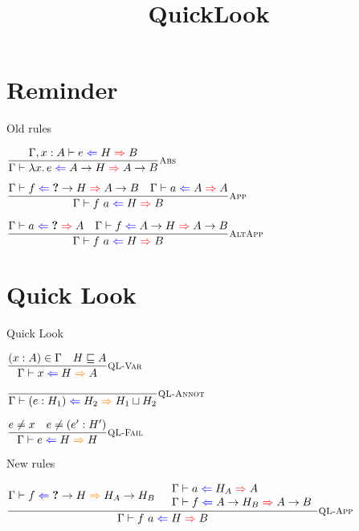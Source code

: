 \documentclass{beamer}
\title{QuickLook}
\date{}
\begin{document}
\frame{\titlepage}

\section{Reminder}

\begin{frame}{Old rules}

\begin{center}
  $\infrule[Abs]{\fullhinting{\extend{\Gamma}{x}{A}}{e}{H}{B}}{\hinting{\fun{x}{e}}{\Fun{A}{H}}{\Fun{A}{B}}}$

  \vspace{2em}

  $\infrule[App]{\hinting{f}{\Fun{\Hole}{H}}{\Fun{A}{B}} \quad \hinting{a}{A}{A}}{\hinting{\app{f}{a}}{H}{B}}$

  \vspace{2em}

  $\infrule[AltApp]{\hinting{a}{\Hole}{A} \quad \hinting{f}{\Fun{A}{H}}{\Fun{A}{B}}}{\hinting{\app{f}{a}}{H}{B}}$
\end{center}

\end{frame}

\section{Quick Look}

\newcommand{\fullquicklook}[4]{#1 \vdash #2 \mathcolor{blue}{\Leftarrow} #3 \mathcolor{orange}{\Rightarrow} #4}
\newcommand{\quicklook}[3]{\fullquicklook{\Gamma}{#1}{#2}{#3}}

\begin{frame}{Quick Look}

\begin{center}
  $\infrule[QL-Var]{\sidecond{(x : A) \in \Gamma} \quad \sidecond{\hintorder{H}{A}}}{\quicklook{x}{H}{A}}$

  \vspace{2em}

  $\infrule[QL-Annot]{}{\quicklook{\annot{e}{H_1}}{H_2}{\hintlub{H_1}{H_2}}}$

  \vspace{2em}

  $\infrule[QL-Fail]{\sidecond{e \neq x} \quad \sidecond{e \neq \annot{e'}{H'}}}{\quicklook{e}{H}{H}}$
\end{center}

\end{frame}

\begin{frame}{New rules}

\begin{center}
  $\infrule[QL-App]{\quicklook{f}{\Fun{\Hole}{H}}{\Fun{H_A}{H_B}} \quad \begin{array}{l} \hinting{a}{H_A}{A} \\ \hinting{f}{\Fun{A}{H_B}}{\Fun{A}{B}} \end{array}}{\hinting{\app{f}{a}}{H}{B}}$
\end{center}

\end{frame}
\end{document}
